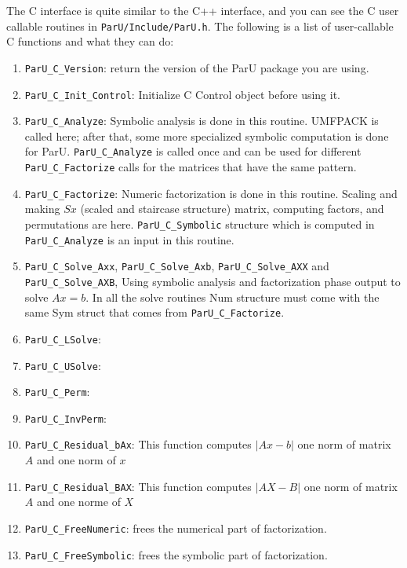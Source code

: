 \documentclass[12pt]{article}
\begin{document}
The C interface is quite similar to the C++ interface, and you can see the C user 
callable routines in 
\verb'ParU/Include/ParU.h'.
The following is a list of user-callable C functions and what they
can do:

\begin{enumerate}

    \item \verb'ParU_C_Version': return the version of the ParU package 
        you are using.

    \item \verb'ParU_C_Init_Control': Initialize C Control object before using 
        it.

    \item \verb'ParU_C_Analyze': Symbolic analysis is done in this routine. 
        UMFPACK is called here; after that, some more specialized symbolic
        computation is done for ParU. 
        \verb'ParU_C_Analyze' is called once and can be used for different 
        \verb'ParU_C_Factorize' calls for the matrices that have the same pattern.
    \item \verb'ParU_C_Factorize': 
        Numeric factorization is done in this routine. Scaling and
        making $Sx$ (scaled and staircase structure) matrix, computing factors,  
        and permutations are here. \verb'ParU_C_Symbolic' structure which is 
        computed in \verb'ParU_C_Analyze' is an input in this routine.

    \item \verb'ParU_C_Solve_Axx',  \verb'ParU_C_Solve_Axb', 
        \verb'ParU_C_Solve_AXX' and \verb'ParU_C_Solve_AXB',  
        Using symbolic analysis and factorization phase output to solve $Ax=b$.
        In all the solve routines Num structure must come with the same 
        Sym struct that comes from \verb'ParU_C_Factorize'. 

    \item \verb'ParU_C_LSolve':       %
    \item \verb'ParU_C_USolve':       %
    \item \verb'ParU_C_Perm':         %
    \item \verb'ParU_C_InvPerm':      %

    \item \verb'ParU_C_Residual_bAx':  
        This function computes $|Ax-b|$ one norm of matrix $A$ and one norm of
        $x$ 

    \item \verb'ParU_C_Residual_BAX':  
        This function computes $|AX-B|$ one norm of matrix $A$ and one norme of
        $X$


    \item \verb'ParU_C_FreeNumeric':  frees the numerical part of factorization.


    \item \verb'ParU_C_FreeSymbolic':  frees the symbolic part of factorization.

\end{enumerate}
\end{document}
